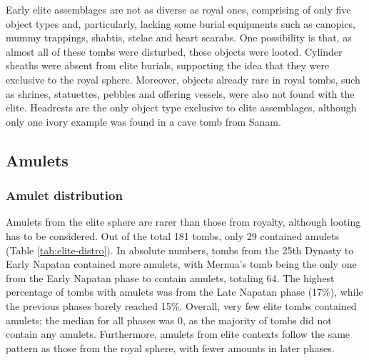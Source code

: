 Early elite assemblages are not as diverse as royal ones, comprising of only five object types and, particularly, lacking some burial equipments such as canopics, mummy trappings, shabtis, stelae and heart scarabs. One possibility is that, as almost all of these tombs were disturbed, these objects were looted. Cylinder sheaths were absent from elite burials, supporting the idea that they were exclusive to the royal sphere. Moreover, objects already rare in royal tombs, such as shrines, statuettes, pebbles and offering vessels, were also not found with the elite. Headrests are the only object type exclusive to elite assemblages, although only one ivory example was found in a cave tomb from Sanam.


\subsection{Amulets}


\subsubsection{Amulet distribution}


Amulets from the elite sphere are rarer than those from royalty, although looting has to be considered. Out of the total 181 tombs, only 29 contained amulets (Table \ref{tab:elite-distro}). In absolute numbers, tombs from the 25th Dynasty to Early Napatan contained more amulets, with Mernua's tomb being the only one from the Early Napatan phase to contain amulets, totaling 64.
The highest percentage of tombs with amulets was from the Late Napatan phase (17\%), while the previous phases barely reached 15\%. Overall, very few elite tombs contained amulets; the median for all phases was 0, as the majority of tombs did not contain any amulets. Furthermore, amulets from elite contexts follow the same pattern as those from the royal sphere, with fewer amounts in later phases.


